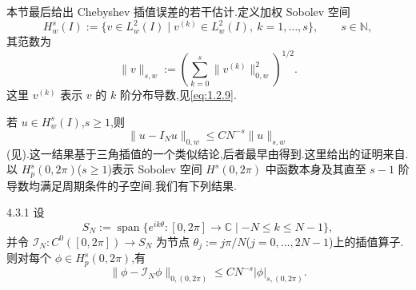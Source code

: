 本节最后给出 Chebyshev 插值误差的若干估计.定义加权 Sobolev 空间
\begin{equation}\label{eq:4.3.25}
  H_w^s(I):=\{v\in L_w^2(I)\mid v^{(k)}\in L_w^2(I),\ k=1,\ldots,s\},
  \qquad s\in\mathbb N,
\end{equation}
其范数为
\begin{equation}\label{eq:4.3.26}
  \|v\|_{s,w}:=\left(\sum_{k=0}^s\|v^{(k)}\|_{0,w}^2\right)^{1/2}.
\end{equation}
这里 \(v^{(k)}\) 表示 \(v\) 的 \(k\) 阶分布导数,见\eqref{eq:1.2.9}.

若 \(u\in H_w^s(I)\),\(s\ge1\),则
\begin{equation}\label{eq:4.3.27}
  \|u-I_Nu\|_{0,w}\le CN^{-s}\|u\|_{s,w}
\end{equation}
(见).这一结果基于三角插值的一个类似结论,后者最早由得到.这里给出的证明来自.以 \(H_p^s(0,2\pi)\)(\(s\ge1\))表示 Sobolev 空间 \(H^s(0,2\pi)\) 中函数本身及其直至 \(s-1\) 阶导数均满足周期条件的子空间.我们有下列结果.

\begin{lemma}[]{4.3.1}
设
\[
  S_N:=\operatorname{span}\{e^{ik\theta}\colon[0,2\pi]\to\mathbb C\mid -N\le k\le N-1\},
\]
并令 \(\mathcal I_N\colon C^0([0,2\pi])\to S_N\) 为节点
\(\theta_j:=j\pi/N\)(\(j=0,\ldots,2N-1\))上的插值算子.则对每个 \(\phi\in H_p^s(0,2\pi)\),有
\begin{equation}\label{eq:4.3.28}
  \|\phi-\mathcal I_N\phi\|_{0,(0,2\pi)}
  \le CN^{-s}|\phi|_{s,(0,2\pi)}.
\end{equation}
\end{lemma}

